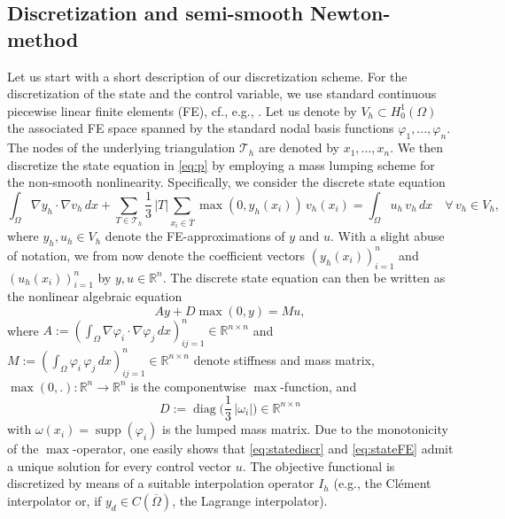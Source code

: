 \documentclass[reqno]{shinyart}
\begin{document}
\subsection{Discretization and semi-smooth Newton-method}

Let us start with a short description of our discretization scheme. 
For the discretization of the state and the control variable, we use standard continuous 
piecewise linear finite elements (FE), cf., e.g., \cite{bs94}. 
Let us denote by $V_h \subset H^1_0(\Omega)$ the associated FE space spanned by the 
standard nodal basis functions $\varphi_1, ..., \varphi_n$. 
The nodes of the underlying triangulation ${\mathcal{T}}_h$ are denoted by $x_1, ..., x_n$.
We then discretize the state equation in \eqref{eq:p} by employing a 
mass lumping scheme for the non-smooth nonlinearity. Specifically,
we consider the discrete state equation
\begin{equation}\label{eq:statediscr}
    \int_\Omega \nabla y_h\cdot \nabla v_h \,dx 
    + \sum_{T\in {\mathcal{T}}_h} \frac{1}{3}\,|T| \sum_{x_i \in \overline{T}} \max(0, y_h(x_i))\, v_h(x_i) 
    = \int_\Omega u_h\,v_h\,dx  \quad \forall\, v_h \in V_h,
\end{equation}
where $y_h, u_h\in V_h$ denote the FE-approximations of $y$ and $u$. 
With a slight abuse of notation, we from now denote the coefficient vectors $(y_h(x_i))_{i=1}^n$
and $(u_h(x_i))_{i=1}^n$ by $y, u \in {\mathbb{R}}^n$. The discrete state equation can then be written  
as the nonlinear algebraic equation
\begin{equation}\label{eq:stateFE}
    A y + D \max(0,y) = M u,
\end{equation}
where $A := (\int_\Omega \nabla \varphi_i\cdot \nabla \varphi_j\,dx)_{ij=1}^n \in {\mathbb{R}}^{n\times n}$
and $M := (\int_\Omega \varphi_i\, \varphi_j\,dx)_{ij=1}^n \in {\mathbb{R}}^{n\times n}$ denote 
stiffness and mass matrix, $\max(0,.): {\mathbb{R}}^n \to {\mathbb{R}}^n$ is the componentwise $\max$-function, and 
\begin{equation*}
    D := {\operatorname{diag}}\Big(\frac{1}{3}\,|\omega_i|\Big) \in {\mathbb{R}}^{n\times n}
\end{equation*}
with $\omega(x_i) = {\operatorname{supp}}(\varphi_i)$ is the lumped mass matrix. Due to the monotonicity of  the $\max$-operator, one easily shows that 
\eqref{eq:statediscr} and \eqref{eq:stateFE} admit a unique solution for every 
control vector $u$. The objective functional is discretized by means of a suitable interpolation operator $I_h$
(e.g., the Cl\'ement interpolator or, if $y_d\in C(\overline{\Omega})$, the Lagrange interpolator).
\end{document}
